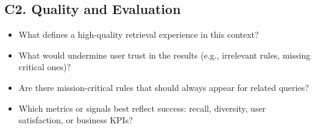\subsection{C2. Quality and Evaluation}
\begin{itemize}
  \item What defines a high-quality retrieval experience in this context?
  \item What would undermine user trust in the results (e.g., irrelevant rules, missing critical ones)?
  \item Are there mission-critical rules that should always appear for related queries?
  \item Which metrics or signals best reflect success: recall, diversity, user satisfaction, or business KPIs?
\end{itemize}
